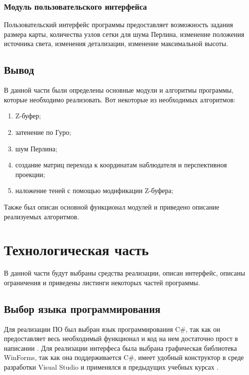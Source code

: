 \documentclass{article}
\begin{document}
	\subsubsection{Модуль пользовательского интерфейса}
	\indent  Пользовательский интерфейс программы предоставляет возможность задания размера карты, количества узлов сетки для шума Перлина, изменение положения источника света, изменения детализации, изменение максимальной высоты.
	\subsection{Вывод}
	\indent В данной части были определены основные модули и алгоритмы программы, которые необходимо реализовать. Вот некоторые из необходимых алгоритмов:
	\begin{enumerate}
		\item Z-буфер;
		\item затенение по Гуро;
		\item шум Перлина;
		\item создание матриц перехода к координатам наблюдателя и перспективноя проекции;
		\item наложение теней с помощью модификации Z-буфера;
	\end{enumerate}
	Также был описан основной функционал модулей и приведено описание реализуемых алгоритмов.
	\newpage
	\section{Технологическая часть}
	\indent В данной части будут выбраны средства реализации, описан интерфейс, описаны ограничения и приведены листинги некоторых частей программы.
	\subsection{Выбор языка программирования}
	\indent Для реализации ПО был выбран язык программирования C\#, так как он предоставляет весь необходимый функционал и код на нем достаточно прост в написании \cite{c-sharp}. Для реализации интерфеса была выбрана графическая библиотека WinForms, так как она поддерживается C\#, имеет удобный конструктор в среде разработки Visual Studio и применялся в предыдущих учебных курсах \cite{winform}.
\end{document}
